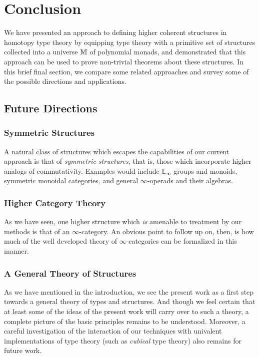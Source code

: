 \section{Conclusion}
\label{sec:concl}

We have presented an approach to defining higher coherent structures
in homotopy type theory by equipping type theory with a primitive set
of structures collected into a universe $\mathbb{M}$ of polynomial monads,
and demonstrated that this approach can be used to prove non-trivial
theorems about these structures.  In this brief final section, we
compare some related approaches and survey some of the possible
directions and applications.

\subsection{Future Directions}
\label{sec:future-directions}

\subsubsection{Symmetric Structures}

A natural class of structures which escapes the capabilities of our
current approach is that of \emph{symmetric structures}, that is,
those which incorporate higher analogs of commutativity.  Examples
would include $\mathbb{E}_{\infty}$ groups and monoids, symmetric
monoidal categories, and general $\infty$-operads and their algebras.

\subsubsection{Higher Category Theory}

As we have seen, one higher structure which \emph{is} amenable to
treatment by our methods is that of an $\infty$-category.  An obvious
point to follow up on, then, is how much of the well developed theory
of $\infty$-categories can be formalized in this manner.

\subsubsection{A General Theory of Structures}

As we have mentioned in the introduction, we see the present work as a
first step towards a general theory of types and structures.  And
though we feel certain that at least some of the ideas of the present
work will carry over to such a theory, a complete picture of the basic
principles remains to be understood.  Moreover, a careful
investigation of the interaction of our techniques with univalent
implementations of type theory (such as \emph{cubical} type theory)
also remains for future work.

